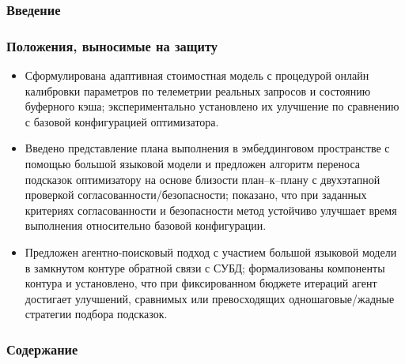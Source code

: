 \begin{frame}
    \setcounter{framenumber}{1}
    \maketitle
\end{frame}
\begin{frame}
    \frametitle{Введение}

\end{frame}


\begin{frame}
    \frametitle{Положения, выносимые на защиту}
    \begin{itemize}
    \item Сформулирована адаптивная стоимостная модель с процедурой онлайн калибровки параметров по телеметрии реальных запросов и состоянию буферного кэша; экспериментально установлено их улучшение по сравнению с базовой конфигурацией оптимизатора.

    \item Введено представление плана выполнения в эмбеддинговом пространстве с помощью большой языковой модели и предложен алгоритм переноса подсказок оптимизатору на основе близости план–к–плану с двухэтапной проверкой согласованности/безопасности; показано, что при заданных критериях согласованности и безопасности метод устойчиво улучшает время выполнения относительно базовой конфигурации.

    \item Предложен агентно-поисковый подход с участием большой языковой модели в замкнутом контуре обратной связи с СУБД; формализованы компоненты контура и установлено, что при фиксированном бюджете итераций агент достигает улучшений, сравнимых или превосходящих одношаговые/жадные стратегии подбора подсказок.
    \end{itemize}
\end{frame}


\begin{frame}
    \frametitle{Содержание}
    \tableofcontents
\end{frame}

